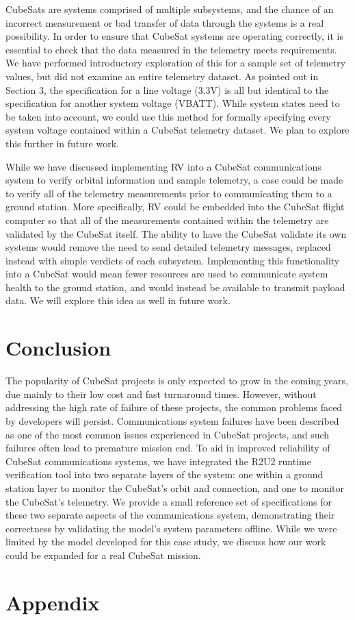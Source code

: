 \documentclass[conf]{new-aiaa}
\begin{document}
CubeSats are systems comprised of multiple subsystems, and the chance of an incorrect measurement or bad transfer of data through the systems is a real possibility. In order to ensure that CubeSat systems are operating correctly, it is essential to check that the data measured in the telemetry meets requirements. We have performed introductory exploration of this for a sample set of telemetry values, but did not examine an entire telemetry dataset. As pointed out in Section 3, the specification for a line voltage (3.3V) is all but identical to the specification for another system voltage (VBATT). While system states need to be taken into account,%
we could use this method for formally specifying every system voltage contained within a CubeSat telemetry dataset. We plan to explore this further in future work.

While we have discussed implementing RV into a CubeSat communications system to verify orbital information and sample telemetry, a case could be made to verify all of the telemetry measurements prior to communicating them to a ground station. More specifically, RV could be embedded into the CubeSat flight computer so that all of the measurements contained within the telemetry are validated by the CubeSat itself. The ability to have the CubeSat validate its own systems would remove the need to send detailed telemetry messages, replaced instead with simple verdicts of each subsystem. Implementing this functionality into a CubeSat would mean fewer resources are used to communicate system health to the ground station, and would instead be available to transmit payload data. We will explore this idea as well in future work.


\section{Conclusion}  \label{Conclusion}

The popularity of CubeSat projects is only expected to grow in the coming years, due mainly to their low cost and fast turnaround times. However, without addressing the high rate of failure of these projects, the common problems faced by developers will persist. Communications system failures have been described as one of the most common issues experienced in CubeSat projects, and such failures often lead to premature mission end. To aid in improved reliability of CubeSat communications systems, we have integrated the R2U2 runtime verification tool into two separate layers of the system: one within a ground station layer to monitor the CubeSat's orbit and connection, and one to monitor the CubeSat's telemetry. We provide a small reference set of specifications for these two separate aspects of the communications system, demonstrating their correctness by validating the model's system parameters offline. While we were limited by the model developed for this case study, we discuss how our work could be expanded for a real CubeSat mission.



\newpage
\section*{Appendix}

\end{document}
